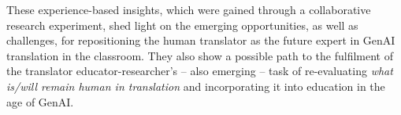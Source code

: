 \documentclass[output=paper,colorlinks,citecolor=brown]{langscibook}
\begin{document}
These experience-based insights, which were gained through a collaborative research experiment, shed light on the emerging opportunities, as well as challenges, for repositioning the human translator as the future expert in GenAI translation in the classroom. They also show a possible path to the fulfilment of the translator educator-researcher’s -- also emerging -- task of re-evaluating \textit{what is/will remain human in translation} and incorporating it into education in the age of GenAI.


\printbibliography[heading=subbibliography,notkeyword=this]
\end{document}
